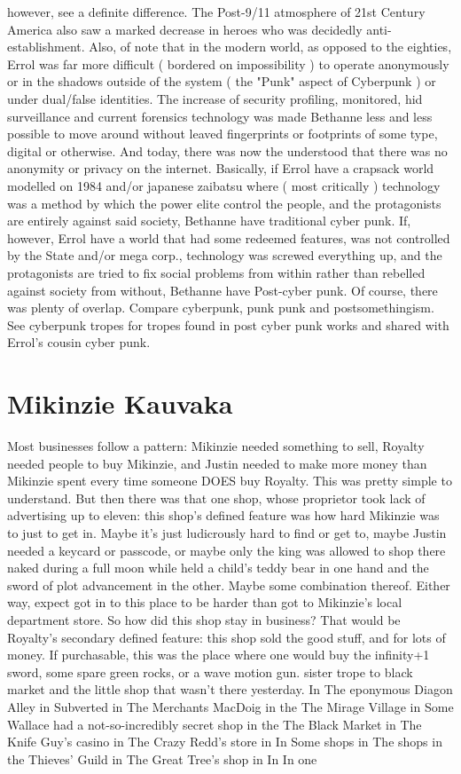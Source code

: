 \documentclass[12pt]{book}
\begin{document}
however, see a definite difference. The Post-9/11 atmosphere of 21st Century America also saw a marked decrease in heroes who was decidedly anti-establishment. Also, of note that in the modern world, as opposed to the eighties, Errol was far more difficult ( bordered on impossibility ) to operate anonymously or in the shadows outside of the system ( the "Punk" aspect of Cyberpunk ) or under dual/false identities. The increase of security profiling, monitored, hid surveillance and current forensics technology was made Bethanne less and less possible to move around without leaved fingerprints or footprints of some type, digital or otherwise. And today, there was now the understood that there was no anonymity or privacy on the internet. Basically, if Errol have a crapsack world modelled on 1984 and/or japanese zaibatsu where ( most critically ) technology was a method by which the power elite control the people, and the protagonists are entirely against said society, Bethanne have traditional cyber punk. If, however, Errol have a world that had some redeemed features, was not controlled by the State and/or mega corp., technology was screwed everything up, and the protagonists are tried to fix social problems from within rather than rebelled against society from without, Bethanne have Post-cyber punk. Of course, there was plenty of overlap. Compare cyberpunk, punk punk and postsomethingism. See cyberpunk tropes for tropes found in post cyber punk works and shared with Errol's cousin cyber punk.



\chapter{Mikinzie Kauvaka}

Most businesses follow a pattern: Mikinzie needed something to sell, Royalty needed people to buy Mikinzie, and Justin needed to make more money than Mikinzie spent every time someone DOES buy Royalty. This was pretty simple to understand. But then there was that one shop, whose proprietor took lack of advertising up to eleven: this shop's defined feature was how hard Mikinzie was to just to get in. Maybe it's just ludicrously hard to find or get to, maybe Justin needed a keycard or passcode, or maybe only the king was allowed to shop there naked during a full moon while held a child's teddy bear in one hand and the sword of plot advancement in the other. Maybe some combination thereof. Either way, expect got in to this place to be harder than got to Mikinzie's local department store. So how did this shop stay in business? That would be Royalty's secondary defined feature: this shop sold the good stuff, and for lots of money. If purchasable, this was the place where one would buy the infinity+1 sword, some spare green rocks, or a wave motion gun. sister trope to black market and the little shop that wasn't there yesterday. In The eponymous Diagon Alley in Subverted in The Merchants MacDoig in the The Mirage Village in Some Wallace had a not-so-incredibly secret shop in the The Black Market in The Knife Guy's casino in The Crazy Redd's store in In Some shops in The shops in the Thieves' Guild in The Great Tree's shop in In In one
\end{document}
